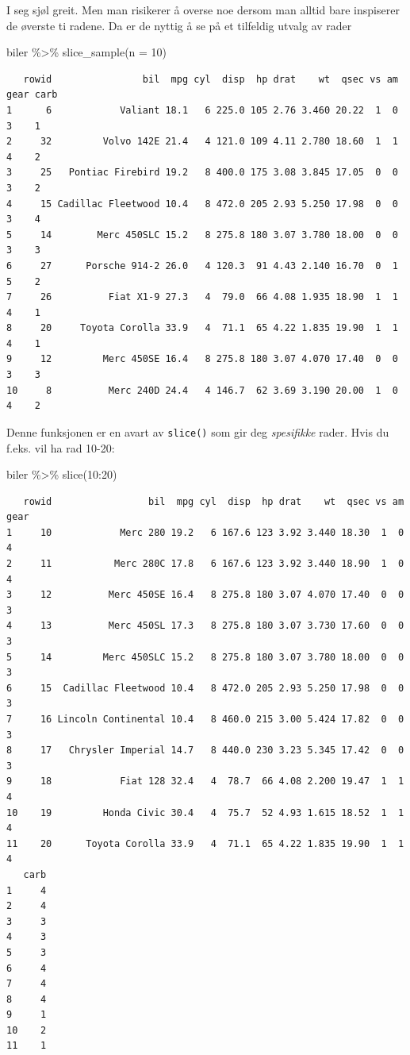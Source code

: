 \documentclass[
  letterpaper,
  DIV=11,
  numbers=noendperiod]{scrreprt}
\newenvironment{Shaded}{\begin{snugshade}}{\end{snugshade}}
\newcommand{\AttributeTok}[1]{\textcolor[rgb]{0.40,0.45,0.13}{#1}}
\newcommand{\DecValTok}[1]{\textcolor[rgb]{0.68,0.00,0.00}{#1}}
\newcommand{\FunctionTok}[1]{\textcolor[rgb]{0.28,0.35,0.67}{#1}}
\newcommand{\NormalTok}[1]{\textcolor[rgb]{0.00,0.23,0.31}{#1}}
\newcommand{\SpecialCharTok}[1]{\textcolor[rgb]{0.37,0.37,0.37}{#1}}
\begin{document}
I seg sjøl greit. Men man risikerer å overse noe dersom man alltid bare
inspiserer de øverste ti radene. Da er de nyttig å se på et tilfeldig
utvalg av rader

\begin{Shaded}
\begin{Highlighting}[]
\NormalTok{biler }\SpecialCharTok{\%\textgreater{}\%} \FunctionTok{slice\_sample}\NormalTok{(}\AttributeTok{n =} \DecValTok{10}\NormalTok{)}
\end{Highlighting}
\end{Shaded}

\begin{verbatim}
   rowid                bil  mpg cyl  disp  hp drat    wt  qsec vs am gear carb
1      6            Valiant 18.1   6 225.0 105 2.76 3.460 20.22  1  0    3    1
2     32         Volvo 142E 21.4   4 121.0 109 4.11 2.780 18.60  1  1    4    2
3     25   Pontiac Firebird 19.2   8 400.0 175 3.08 3.845 17.05  0  0    3    2
4     15 Cadillac Fleetwood 10.4   8 472.0 205 2.93 5.250 17.98  0  0    3    4
5     14        Merc 450SLC 15.2   8 275.8 180 3.07 3.780 18.00  0  0    3    3
6     27      Porsche 914-2 26.0   4 120.3  91 4.43 2.140 16.70  0  1    5    2
7     26          Fiat X1-9 27.3   4  79.0  66 4.08 1.935 18.90  1  1    4    1
8     20     Toyota Corolla 33.9   4  71.1  65 4.22 1.835 19.90  1  1    4    1
9     12         Merc 450SE 16.4   8 275.8 180 3.07 4.070 17.40  0  0    3    3
10     8          Merc 240D 24.4   4 146.7  62 3.69 3.190 20.00  1  0    4    2
\end{verbatim}

Denne funksjonen er en avart av \texttt{slice()} som gir deg
\emph{spesifikke} rader. Hvis du f.eks. vil ha rad 10-20:

\begin{Shaded}
\begin{Highlighting}[]
\NormalTok{biler }\SpecialCharTok{\%\textgreater{}\%} \FunctionTok{slice}\NormalTok{(}\DecValTok{10}\SpecialCharTok{:}\DecValTok{20}\NormalTok{)}
\end{Highlighting}
\end{Shaded}

\begin{verbatim}
   rowid                 bil  mpg cyl  disp  hp drat    wt  qsec vs am gear
1     10            Merc 280 19.2   6 167.6 123 3.92 3.440 18.30  1  0    4
2     11           Merc 280C 17.8   6 167.6 123 3.92 3.440 18.90  1  0    4
3     12          Merc 450SE 16.4   8 275.8 180 3.07 4.070 17.40  0  0    3
4     13          Merc 450SL 17.3   8 275.8 180 3.07 3.730 17.60  0  0    3
5     14         Merc 450SLC 15.2   8 275.8 180 3.07 3.780 18.00  0  0    3
6     15  Cadillac Fleetwood 10.4   8 472.0 205 2.93 5.250 17.98  0  0    3
7     16 Lincoln Continental 10.4   8 460.0 215 3.00 5.424 17.82  0  0    3
8     17   Chrysler Imperial 14.7   8 440.0 230 3.23 5.345 17.42  0  0    3
9     18            Fiat 128 32.4   4  78.7  66 4.08 2.200 19.47  1  1    4
10    19         Honda Civic 30.4   4  75.7  52 4.93 1.615 18.52  1  1    4
11    20      Toyota Corolla 33.9   4  71.1  65 4.22 1.835 19.90  1  1    4
   carb
1     4
2     4
3     3
4     3
5     3
6     4
7     4
8     4
9     1
10    2
11    1
\end{verbatim}
\end{document}
